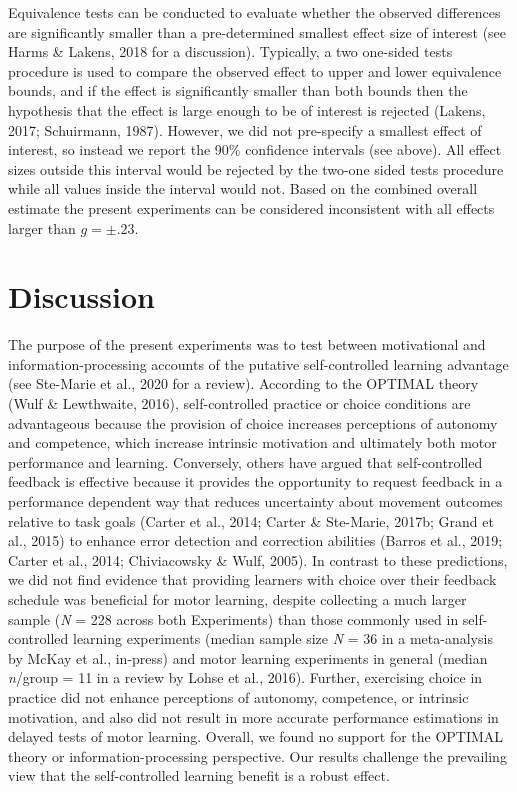 \documentclass[
  doc, donotrepeattitle,floatsintext]{apa7}
\begin{document}
Equivalence tests can be conducted to evaluate whether the observed differences are significantly smaller than a pre-determined smallest effect size of interest (see Harms \& Lakens, 2018 for a discussion). Typically, a two one-sided tests procedure is used to compare the observed effect to upper and lower equivalence bounds, and if the effect is significantly smaller than both bounds then the hypothesis that the effect is large enough to be of interest is rejected (Lakens, 2017; Schuirmann, 1987). However, we did not pre-specify a smallest effect of interest, so instead we report the 90\% confidence intervals (see above). All effect sizes outside this interval would be rejected by the two-one sided tests procedure while all values inside the interval would not. Based on the combined overall estimate the present experiments can be considered inconsistent with all effects larger than \(g = \pm.23\).

\hypertarget{discussion}{%
\section{Discussion}\label{discussion}}

The purpose of the present experiments was to test between motivational and information-processing accounts of the putative self-controlled learning advantage (see Ste-Marie et al., 2020 for a review). According to the OPTIMAL theory (Wulf \& Lewthwaite, 2016), self-controlled practice or choice conditions are advantageous because the provision of choice increases perceptions of autonomy and competence, which increase intrinsic motivation and ultimately both motor performance and learning. Conversely, others have argued that self-controlled feedback is effective because it provides the opportunity to request feedback in a performance dependent way that reduces uncertainty about movement outcomes relative to task goals (Carter et al., 2014; Carter \& Ste-Marie, 2017b; Grand et al., 2015) to enhance error detection and correction abilities (Barros et al., 2019; Carter et al., 2014; Chiviacowsky \& Wulf, 2005). In contrast to these predictions, we did not find evidence that providing learners with choice over their feedback schedule was beneficial for motor learning, despite collecting a much larger sample (\emph{N} = 228 across both Experiments) than those commonly used in self-controlled learning experiments (median sample size \emph{N} = 36 in a meta-analysis by McKay et al., in-press) and motor learning experiments in general (median \emph{n}/group = 11 in a review by Lohse et al., 2016). Further, exercising choice in practice did not enhance perceptions of autonomy, competence, or intrinsic motivation, and also did not result in more accurate performance estimations in delayed tests of motor learning. Overall, we found no support for the OPTIMAL theory or information-processing perspective. Our results challenge the prevailing view that the self-controlled learning benefit is a robust effect.
\end{document}
